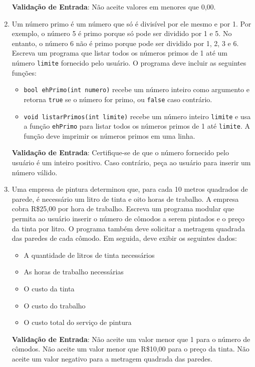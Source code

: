 \documentclass[12pt]{article}
\begin{document}
\begin{enumerate}
          \textbf{Validação de Entrada}: Não aceite valores em menores que 0,00.

    \item Um número primo é um número que só é divisível por ele mesmo e por 1. Por exemplo, o número 5 é primo porque só pode ser dividido por 1 e 5. No entanto, o número 6 não é primo porque pode ser dividido por 1, 2, 3 e 6. Escreva um programa que listar todos os números primos de 1 até um número \texttt{limite} fornecido pelo usuário. O programa deve incluir as seguintes funções:
          \begin{itemize}


              \item \texttt{bool ehPrimo(int numero)} recebe um número inteiro como argumento e retorna \texttt{true} se o número for primo, ou \texttt{false} caso contrário.

              \item  \texttt{void listarPrimos(int limite)} recebe um número inteiro \texttt{limite} e usa a função \texttt{ehPrimo} para listar todos os números primos de 1 até \texttt{limite}. A função deve imprimir os números primos em uma linha.
          \end{itemize}

          \textbf{Validação de Entrada}: Certifique-se de que o número fornecido pelo usuário é um inteiro positivo. Caso contrário, peça ao usuário para inserir um número válido.
    \item Uma empresa de pintura determinou que, para cada 10 metros quadrados de parede, é necessário um litro de tinta e oito horas de trabalho. A empresa cobra R\$25,00 por hora de trabalho. Escreva um programa modular que permita ao usuário inserir o número de cômodos a serem pintados e o preço da tinta por litro. O programa também deve solicitar a metragem quadrada das paredes de cada cômodo. Em seguida, deve exibir os seguintes dados:
          \begin{itemize}
              \item A quantidade de litros de tinta necessários
              \item As horas de trabalho necessárias
              \item O custo da tinta
              \item O custo do trabalho
              \item O custo total do serviço de pintura
          \end{itemize}

          \textbf{Validação de Entrada}: Não aceite um valor menor que 1 para o número de cômodos. Não aceite um valor menor que R\$10,00 para o preço da tinta. Não aceite um valor negativo para a metragem quadrada das paredes.


\end{enumerate}
\end{document}
